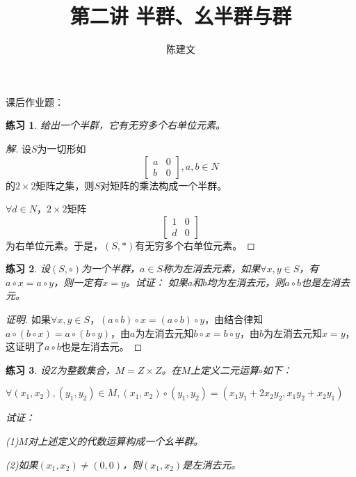 \documentclass{article}
\newtheorem{Exercise}{练习}
\begin{document}
\begin{CJK*}{UTF8}{gbsn}
  \title{第二讲 半群、幺半群与群}
  \author{陈建文}
  \maketitle
  




  课后作业题：

\begin{Exercise}
  给出一个半群，它有无穷多个右单位元素。
\end{Exercise}
\begin{proof}[解]
  设$S$为一切形如
  \[\begin{bmatrix}
    a&0\\
    b&0
  \end{bmatrix},a,b\in N\]
的$2\times 2$矩阵之集，则$S$对矩阵的乘法构成一个半群。

$\forall d\in N$，$2\times 2$矩阵
\[\begin{bmatrix}1&0\\d&0\end{bmatrix}\]
为右单位元素。于是，$(S,*)$有无穷多个右单位元素。  
\end{proof}
\begin{Exercise}
  设$(S,\circ)$为一个半群，$a\in S$称为左消去元素，如果$\forall x, y\in S$，有$a\circ x=a\circ y$，则一定有$x=y$。试证：
  如果$a$和$b$均为左消去元，则$a\circ b$也是左消去元。
\end{Exercise}
\begin{proof}[证明]
  如果$\forall x, y\in S$，$(a\circ b)\circ x=(a\circ b)\circ y$，由结合律知$a\circ (b\circ x)=a\circ (b\circ y)$，由$a$为左消去元知$b\circ x=b\circ y$，由$b$为左消去元知$x=y$，这证明了$a\circ b$也是左消去元。
\end{proof}
\begin{Exercise}
  设$Z$为整数集合，$M=Z\times Z$。在$M$上定义二元运算$\circ$如下：

  $\forall (x_1,x_2), (y_1,y_2)\in M, (x_1,x_2)\circ (y_1,y_2)=(x_1y_1+2x_2y_2,x_1y_2+x_2y_1)$

  试证：

  (1)$M$对上述定义的代数运算构成一个幺半群。

  (2)如果$(x_1,x_2)\neq (0,0)$，则$(x_1,x_2)$是左消去元。


\end{Exercise}
\end{CJK*}
\end{document}
